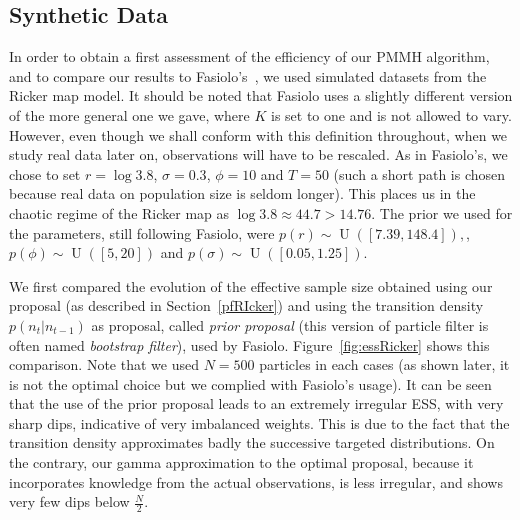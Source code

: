 \documentclass[12pt]{article}
\begin{document}
	
	\subsection{Synthetic Data}
	In order to obtain a first assessment of the efficiency of our PMMH algorithm, and to compare our results to Fasiolo's~\cite{fasiolo2014statistical}, we used simulated datasets from the Ricker map model. It should be noted that Fasiolo uses a slightly different version of the more general one we gave, where $K$ is set to one and is not allowed to vary. However, even though we shall conform with this definition throughout, when we study real data later on, observations will have to be rescaled. As in Fasiolo's, we chose to set $r=\log 3.8$, $\sigma=0.3$, $\phi=10$ and $T=50$ (such a short path is chosen because real data on population size is seldom longer). This places us in the  chaotic regime of the Ricker map as $\log 3.8 \approx 44.7 > 14.76$. The prior we used for the parameters, still following Fasiolo, were $p(r) \sim \operatorname{U}([7.39, 148.4]),$, $p(\phi) \sim \operatorname{U}([5, 20])$ and $p(\sigma) \sim \operatorname{U}([0.05, 1.25])$.
	
	We first compared the evolution of the effective sample size obtained using our proposal (as described in Section~\ref{pfRIcker}) and using the transition density $p(n_t|n_{t-1})$ as proposal, called \emph{prior proposal} (this version of particle filter is often named \emph{bootstrap filter}), used by Fasiolo. Figure~\ref{fig:essRicker} shows this comparison. Note that we used $N=500$ particles in each cases (as shown later, it is not the optimal choice but we complied with Fasiolo's usage). It can be seen that the use of the prior proposal leads to an extremely irregular ESS, with very sharp dips, indicative of very imbalanced weights. This is due to the fact that the transition density approximates badly the successive targeted distributions. On the contrary, our gamma approximation to the optimal proposal, because it incorporates knowledge from the actual observations, is less irregular, and shows very few dips below $\frac{N}{2}$.
	
\end{document}
